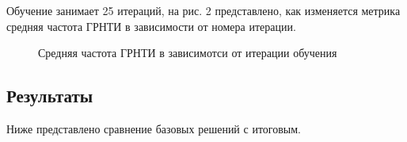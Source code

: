 \documentclass[12pt, twoside]{article}
\begin{document}
Обучение занимает 25 итераций, на рис. 2 представлено, как изменяется метрика средняя частота ГРНТИ в зависимости от номера итерации.

\begin{figure}[h]
\centering
 \caption{Средняя частота ГРНТИ в зависимотси от итерации обучения}
  \label{fig:1}
\end{figure}

\subsection{Результаты}

Ниже представлено сравнение базовых решений с итоговым.
\end{document}
